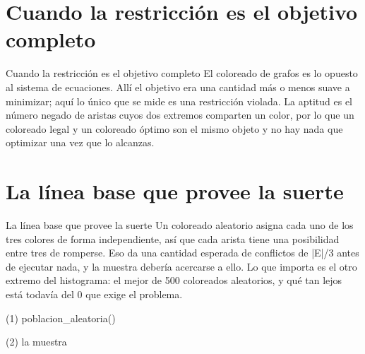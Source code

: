 \section{Cuando la restricción es el objetivo completo}

\begin{frame}{Cuando la restricción es el objetivo completo}
El coloreado de grafos es lo opuesto al sistema de ecuaciones. Allí el objetivo era
una cantidad más o menos suave a minimizar; aquí lo único que se mide es una
restricción violada. La aptitud es el número negado de aristas cuyos dos extremos comparten
un color, por lo que un coloreado legal y un coloreado óptimo son el mismo objeto y
no hay nada que optimizar una vez que lo alcanzas.
\end{frame}


\section{La línea base que provee la suerte}

\begin{frame}{La línea base que provee la suerte}
Un coloreado aleatorio asigna cada uno de los tres colores de forma independiente, así que cada arista
tiene una posibilidad entre tres de romperse. Eso da una cantidad esperada de conflictos
de |E|/3 antes de ejecutar nada, y la muestra debería acercarse a ello. Lo que importa
es el otro extremo del histograma: el mejor de 500 coloreados aleatorios, y qué
tan lejos está todavía del 0 que exige el problema.
\end{frame}

\begin{frame}[fragile]{(1) poblacion\_aleatoria()}

\end{frame}

\begin{frame}[fragile]{(2) la muestra}

\end{frame}

